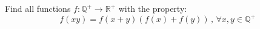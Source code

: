 Find all functions $f: \mathbb{Q}^+ \to \mathbb{R}^+ $ with the property:
\[f(xy)=f(x+y)(f(x)+f(y)) \,,\, \forall x,y \in \mathbb{Q}^+\]

